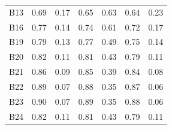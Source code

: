 \documentclass{article}
\theoremstyle{plain}
\theoremstyle{definition}
\theoremstyle{remark}
\begin{document}
\begin{table}[h!]
{\begin{tabular}{lcccccc}
      B13                             &
      0.69                            &
      0.17                            &
      0.65                            &
      0.63                            &
      0.64                            &
      0.23                              \\

      B16                             &
      0.77                            &
      0.14                            &
      0.74                            &
      0.61                            &
      0.72                            &
      0.17                              \\

      B19                             &
      0.79                            &
      0.13                            &
      0.77                            &
      0.49                            &
      0.75                            &
      0.14                              \\

      B20                             &
      0.82                            &
      0.11                            &
      0.81                            &
      0.43                            &
      0.79                            &
      0.11                              \\

      B21                             &
      0.86                            &
      0.09                            &
      0.85                            &
      0.39                            &
      0.84                            &
      0.08                              \\

      B22                             &
      0.89                            &
      0.07                            &
      0.88                            &
      0.35                            &
      0.87                            &
      0.06                              \\

      B23                             &
      0.90                            &
      0.07                            &
      0.89                            &
      0.35                            &
      0.88                            &
      0.06                              \\

      B24                             &
      0.82                            &
      0.11                            &
      0.81                            &
      0.43                            &
      0.79                            &
      0.11                              \\


\end{tabular}}
\end{table}
\end{document}
